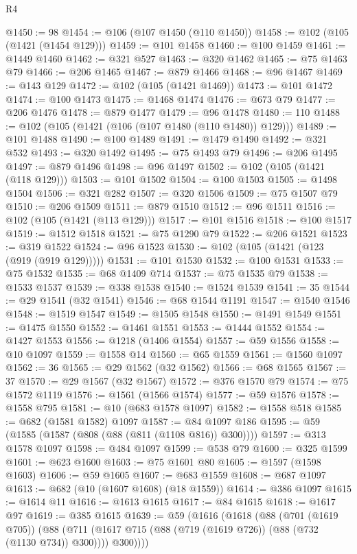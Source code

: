 \begin{lexlean}{R4}
\begin{coremodule}
{{{{{{{{{{{{{{{{{{{{{{{{{{{{{{{{{{{{{{{{{{{{{{{{{{{{{{{{{{{{{{{{{{{{{{{{{{{{{{{{{{{{{{{{{{{{@1450 := 98
@1454 := @106 (@107 @1450 (@110 @1450))
@1458 := @102 (@105 (@1421 (@1454 @129)))
@1459 := @101 @1458
@1460 := @100 @1459
@1461 := @1449 @1460
@1462 := @321 @527
@1463 := @320 @1462
@1465 := @75 @1463 @79
@1466 := @206 @1465
@1467 := @879 @1466
@1468 := @96 @1467
@1469 := @143 @129
@1472 := @102 (@105 (@1421 @1469))
@1473 := @101 @1472
@1474 := @100 @1473
@1475 := @1468 @1474
@1476 := @673 @79
@1477 := @206 @1476
@1478 := @879 @1477
@1479 := @96 @1478
@1480 := 110
@1488 := @102 (@105 (@1421 (@106 (@107 @1480 (@110 @1480)) @129)))
@1489 := @101 @1488
@1490 := @100 @1489
@1491 := @1479 @1490
@1492 := @321 @532
@1493 := @320 @1492
@1495 := @75 @1493 @79
@1496 := @206 @1495
@1497 := @879 @1496
@1498 := @96 @1497
@1502 := @102 (@105 (@1421 (@118 @129)))
@1503 := @101 @1502
@1504 := @100 @1503
@1505 := @1498 @1504
@1506 := @321 @282
@1507 := @320 @1506
@1509 := @75 @1507 @79
@1510 := @206 @1509
@1511 := @879 @1510
@1512 := @96 @1511
@1516 := @102 (@105 (@1421 (@113 @129)))
@1517 := @101 @1516
@1518 := @100 @1517
@1519 := @1512 @1518
@1521 := @75 @1290 @79
@1522 := @206 @1521
@1523 := @319 @1522
@1524 := @96 @1523
@1530 := @102 (@105 (@1421 (@123 (@919 (@919 @129)))))
@1531 := @101 @1530
@1532 := @100 @1531
@1533 := @75 @1532
@1535 := @68 @1409 @714
@1537 := @75 @1535 @79
@1538 := @1533 @1537
@1539 := @338 @1538
@1540 := @1524 @1539
@1541 := 35
@1544 := @29 @1541 (@32 @1541)
@1546 := @68 @1544 @1191
@1547 := @1540 @1546
@1548 := @1519 @1547
@1549 := @1505 @1548
@1550 := @1491 @1549
@1551 := @1475 @1550
@1552 := @1461 @1551
@1553 := @1444 @1552
@1554 := @1427 @1553
@1556 := @1218 (@1406 @1554)
@1557 := @59 @1556
@1558 := @10 @1097
@1559 := @1558 @14
@1560 := @65 @1559
@1561 := @1560 @1097
@1562 := 36
@1565 := @29 @1562 (@32 @1562)
@1566 := @68 @1565
@1567 := 37
@1570 := @29 @1567 (@32 @1567)
@1572 := @376 @1570 @79
@1574 := @75 @1572 @1119
@1576 := @1561 (@1566 @1574)
@1577 := @59 @1576
@1578 := @1558 @795
@1581 := @10 (@683 @1578 @1097)
@1582 := @1558 @518
@1585 := @682 (@1581 @1582) @1097
@1587 := @84 @1097 @186
@1595 := @59 (@1585 (@1587 (@808 (@88 (@811 (@1108 @816)) @300))))
@1597 := @313 @1578 @1097
@1598 := @484 @1097
@1599 := @538 @79
@1600 := @325 @1599
@1601 := @623 @1600
@1603 := @75 @1601 @80
@1605 := @1597 (@1598 @1603)
@1606 := @59 @1605
@1607 := @683 @1559
@1608 := @687 @1097
@1613 := @682 (@10 (@1607 @1608) (@18 @1559))
@1614 := @386 @1097
@1615 := @1614 @11
@1616 := @1613 @1615
@1617 := @84 @1615
@1618 := @1617 @97
@1619 := @385 @1615
@1639 := @59
    (@1616
      (@1618
        (@88
          (@701 (@1619 @705))
          (@88 (@711 (@1617 @715 (@88 (@719 (@1619 @726)) (@88 (@732 (@1130 @734)) @300)))) @300))))
}}}}}}}}}}}}}}}}}}}}}}}}}}}}}}}}}}}}}}}}}}}}}}}}}}}}}}}}}}}}}}}}}}}}}}}}}}}}}}}}}}}}}}}}}}}}
\end{coremodule}
\end{lexlean}
